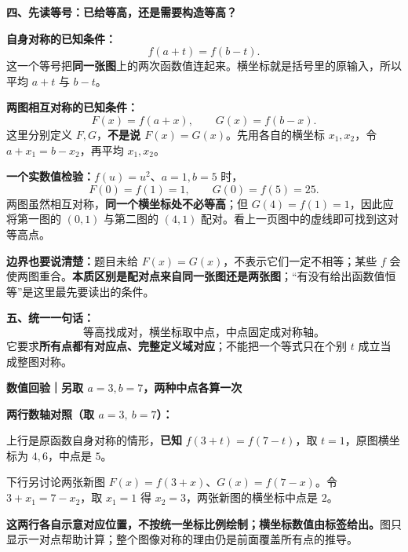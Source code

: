 \begin{explanationbox}
\textbf{四、先读等号：已给等高，还是需要构造等高？}

\textbf{自身对称的已知条件：}
\[\boxed{f(a+t)=f(b-t)}.\]
这一个等号把\textbf{同一张图}上的两次函数值连起来。横坐标就是括号里的原输入，所以平均 $a+t$ 与 $b-t$。

\textbf{两图相互对称的已知条件：}
\[\boxed{F(x)=f(a+x),\qquad G(x)=f(b-x)}.\]
这里分别定义 $F,G$，\textbf{不是说 $F(x)=G(x)$}。先用各自的横坐标 $x_1,x_2$，令 $a+x_1=b-x_2$，再平均 $x_1,x_2$。

\textbf{一个实数值检验：}$f(u)=u^2$、$a=1,b=5$ 时，
\[F(0)=f(1)=1,\qquad G(0)=f(5)=25.\]
两图虽然相互对称，\textbf{同一个横坐标处不必等高}；但 $G(4)=f(1)=1$，因此应将第一图的 $(0,1)$ 与第二图的 $(4,1)$ 配对。看上一页图中的虚线即可找到这对等高点。

\textbf{边界也要说清楚：}题目未给 $F(x)=G(x)$，不表示它们一定不相等；某些 $f$ 会使两图重合。\textbf{本质区别是配对点来自同一张图还是两张图}；“有没有给出函数值恒等”是这里最先要读出的条件。

\textbf{五、统一一句话：}
\[\boxed{\text{等高找成对，横坐标取中点，中点固定成对称轴。}}\]
它要求\textbf{所有点都有对应点、完整定义域对应}；不能把一个等式只在个别 $t$ 成立当成整图对称。
\end{explanationbox}
\clearpage
\begin{explanationbox}
\textbf{数值回验｜另取 $a=3,b=7$，两种中点各算一次}

\textbf{两行数轴对照（取 $a=3,\ b=7$）：}
\begin{center}
\end{center}

上行是原函数自身对称的情形，\textbf{已知} $f(3+t)=f(7-t)$，取 $t=1$，原图横坐标为 $4,6$，中点是 $5$。

下行另讨论两张新图 $F(x)=f(3+x)$、$G(x)=f(7-x)$。令 $3+x_1=7-x_2$，取 $x_1=1$ 得 $x_2=3$，两张新图的横坐标中点是 $2$。

\textbf{这两行各自示意对应位置，不按统一坐标比例绘制；横坐标数值由标签给出。}图只显示一对点帮助计算；整个图像对称的理由仍是前面覆盖所有点的推导。
\end{explanationbox}
